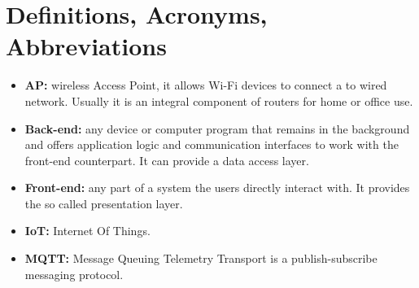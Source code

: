 \section{Definitions, Acronyms, Abbreviations}

\begin{itemize}
	\item \textbf{AP:} wireless Access Point, it allows Wi-Fi devices to connect a to wired network. Usually it is an integral component of routers for home or office use.
	\item \textbf{Back-end:} any device or computer program that remains in the background and offers application logic and communication interfaces to work with the front-end counterpart. It can provide a data access layer.
	\item \textbf{Front-end:} any part of a system the users directly interact with. It provides the so called presentation layer.
	\item \textbf{IoT:} Internet Of Things.
	\item \textbf{MQTT:} Message Queuing Telemetry Transport is a publish-subscribe messaging protocol.
\end{itemize}